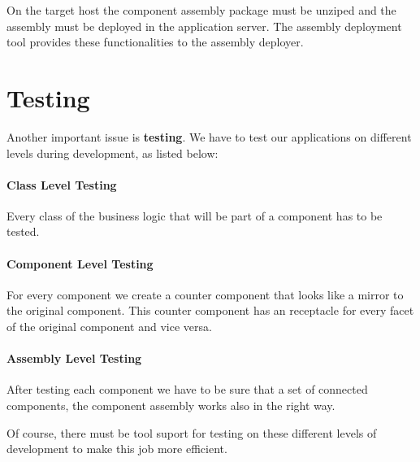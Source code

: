 On the target host the component assembly package must be unziped and the
assembly must be deployed in the application server. The assembly deployment
tool provides these functionalities to the assembly deployer.

\section{Testing}

Another important issue is {\bf testing}. We have to test our applications on
different levels during development, as listed below:

\paragraph{Class Level Testing}

Every class of the business logic that will be part of a component has to be
tested.

\paragraph{Component Level Testing}

For every component we create a counter component that looks like a mirror to
the original component. This counter component has an receptacle for every facet
of the original component and vice versa.

\paragraph{Assembly Level Testing}

After testing each component we have to be sure that a set of connected
components, the component assembly works also in the right way.

Of course, there must be tool suport for testing on these different levels of
development to make this job more efficient.
